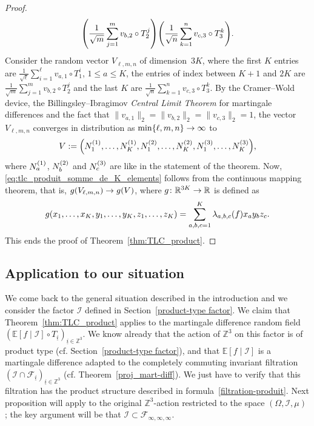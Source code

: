 \documentclass[10pt]{amsart}
\theoremstyle{definition}\newtheorem{defi}[theo]{Definition}\newtheorem{rema}[theo]{Remark}\newtheorem{exam}[theo]{Example}\newtheorem{exem}[theo]{Example}\newtheorem{nota}[theo]{Notation}
\newcommand{\Z}{\mathbb{Z}}
\newcommand*\R{\mathbb{R}}
\newcommand{\bbE}{\mathbb{E}}
\newcommand*\I{\mathcal{I}}
\newcommand*\F{\mathcal{F}}
\newcommand{\pr}[1]{\left(#1\right)}
\renewcommand*{\to}{\mathchoice{\longrightarrow}{\rightarrow}{\rightarrow}{\rightarrow}}
\let\originalleft\left
\let\originalright\right
\renewcommand{\left}{\mathopen{}\mathclose\bgroup\originalleft}
\renewcommand{\right}{\aftergroup\egroup\originalright}
\begin{document}
\begin{proof}
\begin{multline*}
\pr{\frac 1{\sqrt{m}}\sum_{j=1}^m v_{b,2}\circ T_2^j}
\pr{\frac 1{\sqrt{n}}\sum_{k=1}^n v_{c,3}\circ T_3^k}.
\end{multline*}
Consider the random vector $V_{\ell,m,n}$ of dimension~$3K$, where the first $K$ entries are $\frac 1{\sqrt{\ell}}\sum_{i=1}^\ell v_{a,1}\circ T_1^i$, $1\leq a\leq K$, the entries of index between $K+1$ and $2K$ are $\frac 1{\sqrt{m}}\sum_{j=1}^m v_{b,2}\circ T_2^j$ and the last $K$ are $\frac 1{\sqrt{n}}\sum_{k=1}^n v_{c,3}\circ T_3^k$. By the Cramer--Wold device, the Billingsley--Ibragimov \emph{Central Limit Theorem} for martingale differences and the fact that $\|v_{a,1}\|_2=\|v_{b,2}\|_2=\|v_{c,3}\|_2=1$, the vector $V_{\ell,m,n}$ converges in distribution as
$\min\{\ell,m,n\}\to\infty$ to
\[
V:=\pr{N_1^{\pr{1}},\dots,N_K^{\pr{1}},
N_1^{\pr{2}},\dots,N_K^{\pr{2}},N_1^{\pr{3}},\dots,N_K^{\pr{3}}},
\]
where $N_a^{\pr{1}}$, $N_b^{\pr{2}}$ and $N_c^{\pr{3}}$ are like in the statement of the theorem. Now, \eqref{eq:tlc_produit_somme_de_K_elements} follows from the continuous mapping theorem, that is, $g(V_{\ell,m,n})\to g\pr{V}$, where $g\colon \R^{3K}\to \R$ is defined as
\begin{equation*}
g\pr{x_1,\dots,x_K,y_1,\dots,y_K,z_1,\dots,z_K} =\sum_{a,b,c=1}^K\lambda_{a,b,c}\pr{f} x_ay_bz_c.
\end{equation*}
This ends the proof of Theorem~\ref{thm:TLC_product}.
\end{proof}

\subsection{Application to our situation} \label{appli_to_I}
We come back to the general situation described in the introduction and we consider the factor $\I$ defined in Section~\ref{product-type factor}. We claim that Theorem~\ref{thm:TLC_product} applies to the martingale difference random field $(\bbE[f\mid\I]\circ T_{\underline{i}})_{\underline{i}\in\Z^3}$. We know already that the action of $\Z^3$ on this factor is of product type (cf. Section~\ref{product-type factor}), and that $\bbE[f\mid\I]$ is a martingale difference adapted to the completely commuting invariant filtration $(\I\cap\F_{\underline{i}})_{\underline{i}\in\Z^3}$ (cf. Theorem~\ref{proj_mart-diff}). We just have to verify that this filtration has the product structure described in formula~\eqref{filtration-produit}. Next proposition will apply to the original $\Z^3$-action restricted to the space $(\Omega,\I,\mu)$ ; the key argument will be that $\I\subset\F_{\infty,\infty,\infty}$.
\end{document}
